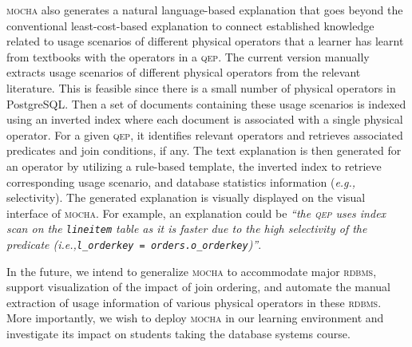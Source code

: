 \documentclass[11pt]{article}
\newcommand{\ie}{\emph{i.e.,}\xspace}
\newcommand{\eg}{\emph{e.g.,}\xspace}
\begin{document}
\textsc{mocha} also generates a natural language-based explanation that goes beyond the conventional least-cost-based explanation to connect established knowledge related to usage scenarios of different physical operators that a learner has learnt from textbooks with the operators in a \textsc{qep}. The current version manually extracts usage scenarios of different physical operators from the relevant literature. This is feasible since there is a small number of physical operators in PostgreSQL. Then a set of documents containing these usage scenarios is indexed using an inverted index where each document is associated with a single physical operator.
For a given \textsc{qep}, it identifies relevant operators and retrieves associated predicates and join conditions, if any. The text explanation is then generated for an operator by utilizing a rule-based template, the inverted index to retrieve corresponding usage scenario,  and database statistics information (\eg selectivity).  The generated explanation is visually displayed on the visual interface of \textsc{mocha}. For example, an explanation could be \textit{``the \textsc{qep} uses index scan on the \texttt{lineitem} table as it is faster due to the high selectivity of the predicate (\ie \texttt{l\_orderkey = orders.o\_orderkey})''}. 

In the future, we intend to generalize \textsc{mocha} to accommodate major \textsc{rdbms}, support visualization of the impact of join ordering, and automate the manual extraction of usage information of various physical operators in these \textsc{rdbms}. More importantly, we wish to deploy \textsc{mocha} in our learning environment and investigate its impact on students taking the database systems course.

\end{document}
